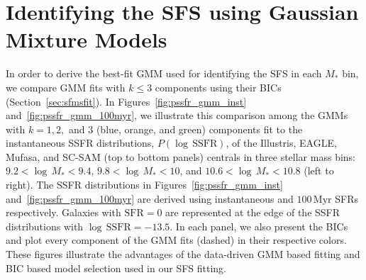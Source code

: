 \documentclass[tighten, preprint]{aastex62}
\begin{document}
\section{Identifying the SFS using Gaussian Mixture Models} \label{app:gmm_pssfr}
{\color{red}
In order to derive the best-fit GMM used for identifying the SFS in 
each $M_*$ bin, we compare GMM fits with $k\leq 3$ components using
their BICs (Section~\ref{sec:sfmsfit}). In Figures~\ref{fig:pssfr_gmm_inst} 
and~\ref{fig:pssfr_gmm_100myr}, we illustrate this comparison among the  
GMMs with $k=1, 2,$ and $3$ (blue, orange, and green) components fit
to the instantaneous SSFR distributions, $P(\log\,\mathrm{SSFR})$, of the 
Illustris, EAGLE, {\sc Mufasa}, and SC-SAM (top to bottom panels) centrals 
in three stellar mass bins: 
$9.2 <\log\,M_*<9.4$, $9.8 <\log\,M_*<10$, and $10.6 <\log\,M_*<10.8$ (left to right). 
The SSFR distributions in Figures~\ref{fig:pssfr_gmm_inst} 
and~\ref{fig:pssfr_gmm_100myr} are derived using instantaneous and 
$100\,\mathrm{Myr}$ SFRs respectively. Galaxies with $\mathrm{SFR}{=}0$
are represented at the edge of the SSFR distributions with $\log\,\mathrm{SSFR}=-13.5$.
In each panel, we also present the BICs and plot every component of the 
GMM fits (dashed) in their respective colors. These figures illustrate
the advantages of the data-driven GMM based fitting and BIC based
model selection used in our SFS fitting.

}
\end{document}
